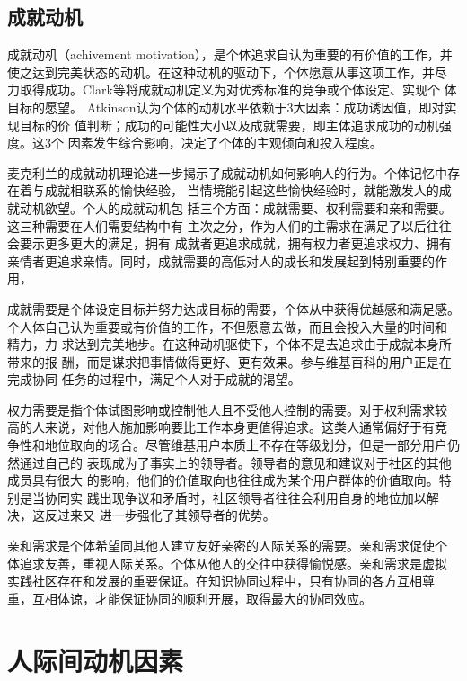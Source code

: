 \subsection{成就动机}
\label{sec:achievement}
成就动机（achivement motivation），是个体追求自认为重要的有价值的工作，并
使之达到完美状态的动机。在这种动机的驱动下，个体愿意从事这项工作，并尽
力取得成功。Clark等将成就动机定义为对优秀标准的竞争或个体设定、实现个
体目标的愿望\cite{clark1956hope}。
Atkinson认为个体的动机水平依赖于3大因素：成功诱因值，即对实现目标的价
值判断；成功的可能性大小以及成就需要，即主体追求成功的动机强度。这3个
因素发生综合影响，决定了个体的主观倾向和投入程度\cite{atkinson1953achievement}。

麦克利兰的成就动机理论进一步揭示了成就动机如何影响人的行为。个体记忆中存在着与成就相联系的愉快经验，
当情境能引起这些愉快经验时，就能激发人的成就动机欲望。个人的成就动机包
括三个方面：成就需要、权利需要和亲和需要。这三种需要在人们需要结构中有
主次之分，作为人们的主需求在满足了以后往往会要示更多更大的满足，拥有
成就者更追求成就，拥有权力者更追求权力、拥有亲情者更追求亲情。同时，成就需要的高低对人的成长和发展起到特别重要的作用，

成就需要是个体设定目标并努力达成目标的需要，个体从中获得优越感和满足感。
个人体自己认为重要或有价值的工作，不但愿意去做，而且会投入大量的时间和
精力，力
求达到完美地步。在这种动机驱使下，个体不是去追求由于成就本身所带来的报
酬，而是谋求把事情做得更好、更有效果。参与维基百科的用户正是在完成协同
任务的过程中，满足个人对于成就的渴望。

权力需要是指个体试图影响或控制他人且不受他人控制的需要。对于权利需求较
高的人来说，对他人施加影响要比工作本身更值得追求。这类人通常偏好于有竞
争性和地位取向的场合。尽管维基用户本质上不存在等级划分，但是一部分用户仍然通过自己的
表现成为了事实上的领导者。领导者的意见和建议对于社区的其他成员具有很大
的影响，他们的价值取向也往往成为某个用户群体的价值取向。特别是当协同实
践出现争议和矛盾时，社区领导者往往会利用自身的地位加以解决，这反过来又
进一步强化了其领导者的优势。

亲和需求是个体希望同其他人建立友好亲密的人际关系的需要。亲和需求促使个
体追求友善，重视人际关系。个体从他人的交往中获得愉悦感。亲和需求是虚拟
实践社区存在和发展的重要保证。在知识协同过程中，只有协同的各方互相尊
重，互相体谅，才能保证协同的顺利开展，取得最大的协同效应。

\section{人际间动机因素}
\label{sec:groupe-motivation}

